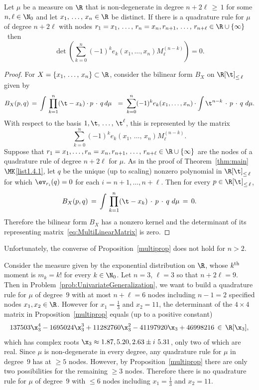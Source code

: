 \begin{prop}\label{multiprop}
Let $\mu$ be a measure on $\R$ that is non-degenerate in degree $n+2\ell\,\geq\,1$ for some $n,\ell \in\N_0$ and let $x_1,\,\hdots,\,x_{n} \in \R$ be distinct. If there is a quadrature rule for $\mu$ of degree $n+2\ell$ with nodes $r_1 = x_1,\,\hdots,\,r_n = x_n, r_{n+1},\,\dots,\,r_{n+\ell}\in\R\cup\{\infty\}$~then
\[
\det\left(\sum_{k=0}^n (-1)^k e_k(x_1,\dots,x_n) M^{(n-k)}_{\ell}\right)=0.
\]
\end{prop}

\begin{proof}
For $X = \{x_1,\,\hdots,\,x_{n}\} \subset \R$, consider the bilinear form $B_{X}$ on $\R[\t]_{\leq\,\ell}$ given by
\[
B_X(p,q) \, = \, \int \, \prod_{k=1}^{n}(\t-x_k) \cdot p\,\cdot\,q \, d\mu
\ \ = \; \sum_{k=0}^n (-1)^k e_k(x_1,\dots,x_n) \cdot \int \t^{n-k}\,\cdot\,p\,\cdot\,q \ d\mu.
\]
With respect to the basis $1,\t,\,\hdots,\, \t^{\ell}$, this is represented by the matrix
\begin{equation}\label{eq:MultiLinearMatrix}
\sum_{k=0}^n (-1)^k e_k(x_1,\,\dots,\,x_n) M^{(n-k)}_{\ell}.
\end{equation}
Suppose that $r_1 = x_1, \hdots, r_n = x_n, r_{n+1},\,\dots,\,r_{n+\ell}\in\R\cup\{\infty\}$ are the nodes of a quadrature rule of degree $n+2\ell$ for $\mu$. As in the proof of Theorem~\ref{thm:main}$\MK$\eqref{list1.4.1}, let $q$ be the unique (up to scaling) nonzero polynomial in $\R[\t]_{\leq\,\ell}$ for which $\ev_{r_i}(q)=0$ for each $i = n+1, \hdots, n+\ell$. Then for every $p\in \R[\t]_{\leq\,\ell}$,
\[
B_X(p,q) \, = \, \int \, \prod_{k=1}^{n}(\t-x_k)\,\cdot\,p\,\cdot\,q \ d\mu \, = \, 0.
\]
Therefore the bilinear form $B_X$ has a nonzero kernel and the determinant of its representing matrix~\eqref{eq:MultiLinearMatrix} is zero.
\end{proof}

Unfortunately, the converse of Proposition~\ref{multiprop} does not hold for $n>2$.

\begin{exam}
Consider the measure given by the exponential distribution on $\R$, whose $k^{\rm th}$ moment is $m_k = k!$ for every $k\in \N_0$. Let $n = 3$, $\ell=3$ so that $n+2\ell=9$. Then in Problem~\ref{prob:UnivariateGeneralization}, we want to build a quadrature rule for $\mu$ of degree~$9$ with at most $ n+\ell=6$ nodes including $n-1=2$ specified nodes $x_1, x_2 \in \R$. However for $x_1=\frac13$ and $x_2=11$, the determinant of the $4\times 4$ matrix in Proposition~\ref{multiprop} equals (up to a positive constant)
\[
137503\x_3^4 -1695024\x_3^3+11282760\x_3^2-41197920\x_3+46998216 \, \in \, \R[\x_3],
\]
which has complex roots $\x_3 \approx 1.87, 5.20, 2.63 \pm i \ 5.31$, only two of which are real. Since $\mu$ is non-degenerate in every degree, any quadrature rule for $\mu$ in degree~$9$ has at $\geq 5$ nodes. However, by Proposition~\ref{multiprop} there are only two possibilities for the remaining $\geq 3$ nodes. Therefore there is no quadrature rule for $\mu$ of degree~$9$ with $\leq 6$ nodes including $x_1=\frac13$ and $x_2=11$.
\end{exam}



